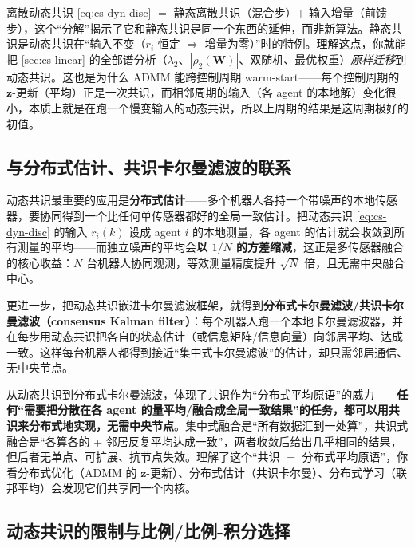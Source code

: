 \begin{insight}[动态共识 $=$ 静态共识 $+$ 输入增量前馈]\label{ins:cs-dyn-decompose}
离散动态共识 \cref{eq:cs-dyn-disc} $=$ 静态离散共识（混合步）$+$ 输入增量（前馈步），这个“分解”揭示了它和静态共识是同一个东西的延伸，而非新算法。静态共识是动态共识在“输入不变（$r_i$ 恒定 $\Rightarrow$ 增量为零）”时的特例。理解这点，你就能把 \cref{sec:cs-linear} 的全部谱分析（$\lambda_2$、$|\rho_2(\mathbf{W})|$、双随机、最优权重）\emph{原样迁移}到动态共识。这也是为什么 ADMM 能跨控制周期 warm-start——每个控制周期的 $\mathbf{z}$-更新（平均）正是一次共识，而相邻周期的输入（各 agent 的本地解）变化很小，本质上就是在跑一个慢变输入的动态共识，所以上周期的结果是这周期极好的初值。
\end{insight}

\subsection{与分布式估计、共识卡尔曼滤波的联系}
\label{sec:cs-dyn-kalman}

动态共识最重要的应用是\textbf{分布式估计}——多个机器人各持一个带噪声的本地传感器，要协同得到一个比任何单传感器都好的全局一致估计。把动态共识 \cref{eq:cs-dyn-disc} 的输入 $r_i(k)$ 设成 agent $i$ 的本地测量，各 agent 的估计就会收敛到所有测量的平均——而独立噪声的平均会\textbf{以 $1/N$ 的方差缩减}，这正是多传感器融合的核心收益：$N$ 台机器人协同观测，等效测量精度提升 $\sqrt N$ 倍，且无需中央融合中心。

更进一步，把动态共识嵌进卡尔曼滤波框架，就得到\textbf{分布式卡尔曼滤波/共识卡尔曼滤波（consensus Kalman filter）}\cite{olfatisaber2007kalman}：每个机器人跑一个本地卡尔曼滤波器，并在每步用动态共识把各自的状态估计（或信息矩阵/信息向量）向邻居平均、达成一致。这样每台机器人都得到接近“集中式卡尔曼滤波”的估计，却只需邻居通信、无中央节点。

\begin{insight}\label{ins:cs-dyn-primitive}
从动态共识到分布式卡尔曼滤波，体现了共识作为“分布式平均原语”的威力——\textbf{任何“需要把分散在各 agent 的量平均/融合成全局一致结果”的任务，都可以用共识来分布式地实现，无需中央节点}。集中式融合是“所有数据汇到一处算”，共识式融合是“各算各的 + 邻居反复平均达成一致”，两者收敛后给出几乎相同的结果，但后者无单点、可扩展、抗节点失效。理解了这个“共识 $=$ 分布式平均原语”，你看分布式优化（ADMM 的 $\mathbf{z}$-更新）、分布式估计（共识卡尔曼）、分布式学习（联邦平均）会发现它们共享同一个内核。
\end{insight}

\subsection{动态共识的限制与比例/比例-积分选择}
\label{sec:cs-dyn-limit}

